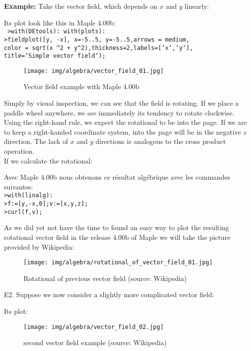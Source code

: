 	\begin{tcolorbox}[colframe=black,colback=white,sharp corners]
	\textbf{{\Large {}}Example:}
	Take the vector field, which depends on $x$ and $y$ linearly:
	
	Its plot look like this in Maple 4.00b:\\
	
	\texttt{
	>with(DEtools): with(plots):\\
	>fieldplot([y, -x], x=-5..5, y=-5..5,arrows = medium, \\
	color = sqrt(x \string^2 + y\string^2),thickness=2,labels=[`x`,`y`],\\
	title=`Simple vector field`);	
	}
	\begin{figure}[H]
		\centering
		\texttt{[image: img/algebra/vector\_field\_01.jpg]}
		\caption[]{Vector field example with Maple 4.00b}
	\end{figure}
	Simply by visual inspection, we can see that the field is rotating. If we place a paddle wheel anywhere, we see immediately its tendency to rotate clockwise. Using the right-hand rule, we expect the rotational to be into the page. If we are to keep a right-handed coordinate system, into the page will be in the negative $z$ direction. The lack of $x$ and $y$ directions is analogous to the cross product operation.\\

	If we calculate the rotational:
	
	\end{tcolorbox}
	
	\pagebreak
	\begin{tcolorbox}[colframe=black,colback=white,sharp corners]
	Avec Maple 4.00b nous obtenons ce résultat algébrique avec les commandes suivantes:\\
	
	\texttt{>with(linalg):\\
	>f:=[y,-x,0];v:=[x,y,z];\\
	>curl(f,v);\\
	}
	
	As we did yet not have the time to found an easy way to plot the resulting rotational vector field in the release 4.00b of Maple we will take the picture provided by Wikipedia:
	\begin{figure}[H]
		\centering
		\texttt{[image: img/algebra/rotational\_of\_vector\_field\_01.jpg]}
		\caption[]{Rotational of previous vector field (source: Wikipedia)}
	\end{figure}
		
	E2. Suppose we now consider a slightly more complicated vector field:
	
	Its plot:
	\begin{figure}[H]
		\centering
		\texttt{[image: img/algebra/vector\_field\_02.jpg]}
		\caption[]{second vector field example (source: Wikipedia)}
	\end{figure}
	\end{tcolorbox}
	
